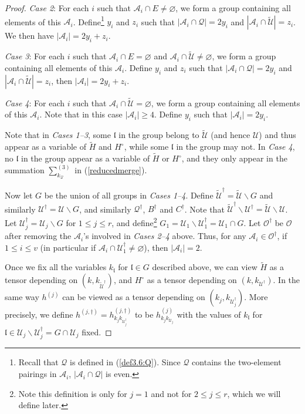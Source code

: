 \documentclass[11 pt,reqno]{amsart}
\theoremstyle{definition}
\theoremstyle{remark}
\numberwithin{equation}{section}
\newcommand{\Qc}{\mathcal{Q}}
\newcommand{\Uc}{\mathcal{U}}
\newcommand{\Ac}{\mathcal{A}}
\newcommand{\lf}{\mathfrak{l}}
\newcommand{\Os}{\mathscr{O}}
\begin{document}
{\begin{proof}
\emph{Case 2}:
For each $i$ such that $\Ac_i\cap E\neq\varnothing$, we form a group containing all elements of this $\Ac_i$.
Define\footnote{Recall that $\Qc$ is defined in (\ref{def3.6:Q}). Since $\Qc$ contains the two-element pairings in $\Ac_i$, $|\Ac_i\cap\Qc|$ is even.} $y_i$ and $z_i$ such that $|\Ac_i\cap\Qc|=2y_i$ and $|\Ac_i\cap\widetilde{\Uc}|=z_i$. We then have $|\Ac_i|=2y_i+z_i$.

\emph{Case 3}:
For each $i$ such that $\Ac_i\cap E=\varnothing$ and $\Ac_i\cap\widetilde{\Uc}\neq\varnothing$, we form a group containing all elements of this $\Ac_i$. Define $y_i$ and $z_i$ such that $|\Ac_i\cap\Qc|=2y_i$ and $|\Ac_i\cap\widetilde{\Uc}|=z_i$, then $|\Ac_i|=2y_i+z_i$.

\emph{Case 4}: For each $i$ such that $\Ac_i\cap\widetilde{\Uc}=\varnothing$, we form a group containing all elements of this $\Ac_i$. Note that in this case $|\Ac_i|\geq 4$. Define $y_i$ such that $|\Ac_i|=2y_i$.

Note that in \emph{Cases 1--3}, some $\lf$ in the group belong to $\widetilde{\Uc}$ (and hence $\Uc$) and thus appear as a variable of $\widetilde{H}$ and $H^\circ$, while some $\lf$ in the group may not. In \emph{Case 4}, no $\lf$ in the group appear as a variable of $\widetilde{H}$ or $H^\circ$, and they only appear in the summation $\sum_{k_\Qc}^{(3)}$ in (\ref{reducedmerge}).

Now let $G$ be the union of all groups in \emph{Cases 1--4}. Define $\widetilde{\Uc}^\dagger=\widetilde{\Uc}\backslash G$ and similarly $\Uc^\dagger=\Uc\backslash G$, and similarly $\Qc^\dagger$, $B^\dagger$ and $C^\dagger$. Note that $\widetilde{\Uc}^\dagger\backslash\Uc^\dagger=\widetilde{\Uc}\backslash\Uc$.  Let $\Uc_j^\dagger=\Uc_j\backslash G$ for $1\leq j\leq r$, and define\footnote{Note this definition is only for $j=1$ and not for $2\leq j\leq r$, which we will define later.} $G_1=\Uc_1\backslash\Uc_1^\dagger=\Uc_1\cap G$. Let $\Os^\dagger$ be $\Os$ after removing the $\Ac_i$'s involved in \emph{Cases 2--4} above. Thus, for any $\Ac_i\in\Os^\dagger$, if $1\leq i\leq v$ (in particular if $\Ac_i\cap \Uc_1^\dagger\neq\varnothing$), then $|\Ac_i|=2$.

Once we fix all the variables $k_\lf$ for $\lf \in G$ described above, we can view $\widetilde{H}$ as a tensor depending on $(k,k_{\widetilde{\Uc}^\dagger})$, and $H^\circ$ as a tensor depending on $(k,k_{\Uc^\dagger})$. In the same way $h^{(j)}$ can be viewed as a tensor depending on $(k_j,k_{\Uc_j^\dagger})$. More precisely, we define $h^{(j,\dagger)}=h_{k_jk_{\Uc_j^{\dagger}}}^{(j,\dagger)}$ to be $h_{k_jk_{\Uc_j}}^{(j)}$ with the values of $k_\lf$ for $\lf\in\Uc_j\backslash \Uc_j^{\dagger} = G \cap \Uc_j$ fixed.


\end{proof}}
\end{document}
